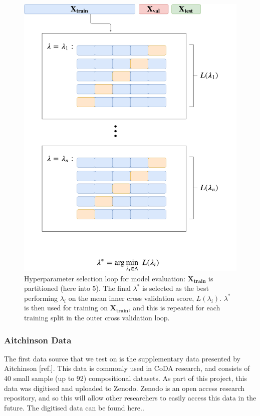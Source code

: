 \begin{figure}
    \centering
    \includegraphics[width = \columnwidth]{figs/cross_val(1)(1).pdf}
    \caption{Hyperparameter selection loop for model evaluation: $\mathbf{X_{train}}$ is partitioned (here into 5). The final $\lambda^*$ is selected as the best performing $\lambda_i$ on the mean inner cross validation score, $L(\lambda_i)$. $\lambda^*$ is then used for training on $\mathbf{X_{train}}$, and this is repeated for each training split in the outer cross validation loop. }
    \label{fig:cross_val}
\end{figure}


\subsubsection{Aitchinson Data}
The first data source that we test on is the supplementary data presented by Aitchinson [ref.]. This data is commonly used in CoDA research, and consists of 40 small sample (up to 92) compositional datasets. As part of this project, this data was digitised and uploaded to Zenodo. Zenodo is an open access research repository, and so this will allow other researchers to easily access this data in the future. The digitised data can be found here..  


